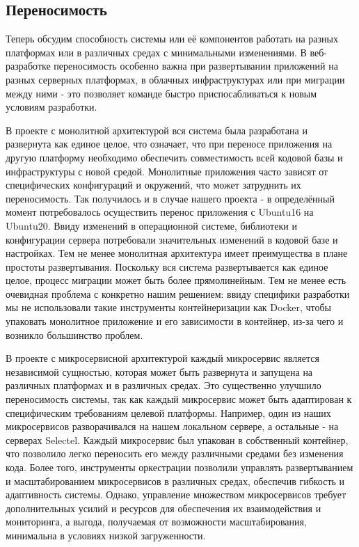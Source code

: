 \subsection{Переносимость}
    Теперь обсудим способность системы или её компонентов работать на разных платформах или в различных средах с минимальными изменениями. В веб-разработке переносимость особенно важна при развертывании приложений на разных серверных платформах, в облачных инфраструктурах или при миграции между ними - это позволяет команде быстро приспосабливаться к новым условиям разработки.
    
    В проекте с монолитной архитектурой вся система была разработана и развернута как единое целое, что означает, что при переносе приложения на другую платформу необходимо обеспечить совместимость всей кодовой базы и инфраструктуры с новой средой. Монолитные приложения часто зависят от специфических конфигураций и окружений, что может затруднить их переносимость. Так получилось и в случае нашего проекта - в определённый момент потребовалось осуществить перенос приложения с Ubuntu16 на Ubuntu20. Ввиду изменений в операционной системе, библиотеки и конфигурации сервера потребовали значительных изменений в кодовой базе и настройках. Тем не менее монолитная архитектура имеет преимущества в плане простоты развертывания. Поскольку вся система развертывается как единое целое, процесс миграции может быть более прямолинейным. Тем не менее есть очевидная проблема с конкретно нашим решением: ввиду специфики разработки мы не использовали такие инструменты контейнеризации как Docker, чтобы упаковать монолитное приложение и его зависимости в контейнер, из-за чего и возникло большинство проблем.
    
    В проекте с микросервисной архитектурой каждый микросервис является независимой сущностью, которая может быть развернута и запущена на различных платформах и в различных средах. Это существенно улучшило переносимость системы, так как каждый микросервис может быть адаптирован к специфическим требованиям целевой платформы. Например, один из наших микросервисов разворачивался на нашем локальном сервере, а остальные - на серверах Selectel. Каждый микросервис был упакован в собственный контейнер, что позволило легко переносить его между различными средами без изменения кода. Более того, инструменты оркестрации позволили управлять развертыванием и масштабированием микросервисов в различных средах, обеспечив гибкость и адаптивность системы. Однако, управление множеством микросервисов требует дополнительных усилий и ресурсов для обеспечения их взаимодействия и мониторинга, а выгода, получаемая от возможности масштабирования, минимальна в условиях низкой загруженности.
    
